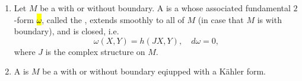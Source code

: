 \begin{definition} \label{definition:kahler_metric_on_a_complex_manifold_and_kahler_manifold}
    \begin{enumerate}
        \item Let $M$ be a  with or without boundary. A  is a  whose associated fundamental $2$-form \hl{$\omega$}, called the , extends smoothly to all of $M$ (in case that $M$ is with boundary), and is closed, i.e. 
        \[
        \omega(X,Y) = h(JX, Y), \quad d\omega = 0,
        \]
        where \( J \) is the complex structure on \( M \).

        \item A  is  $M$ be a  with or without boundary eqiupped with a K\"ahler form. 
    \end{enumerate}
\end{definition}